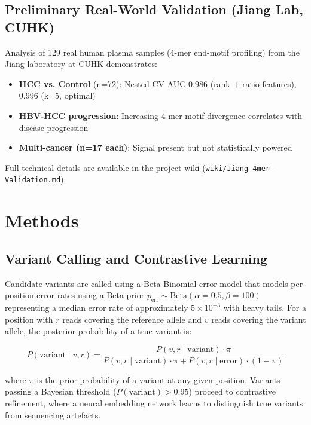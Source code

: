 \documentclass[11pt,a4paper]{article}
\begin{document}
\subsection{Preliminary Real-World Validation (Jiang Lab, CUHK)}

Analysis of 129 real human plasma samples (4-mer end-motif profiling) from the Jiang laboratory at CUHK demonstrates:

\begin{itemize}
    \item \textbf{HCC vs. Control} (n=72): Nested CV AUC 0.986 (rank + ratio features), 0.996 (k=5, optimal)
    \item \textbf{HBV-HCC progression}: Increasing 4-mer motif divergence correlates with disease progression
    \item \textbf{Multi-cancer (n=17 each)}: Signal present but not statistically powered
\end{itemize}

Full technical details are available in the project wiki (\texttt{wiki/Jiang-4mer-Validation.md}).

\section{Methods}

\subsection{Variant Calling and Contrastive Learning}

Candidate variants are called using a Beta-Binomial error model that models per-position error rates using a Beta prior $p_{\text{err}} \sim \text{Beta}(\alpha=0.5, \beta=100)$ representing a median error rate of approximately $5 \times 10^{-3}$ with heavy tails. For a position with $r$ reads covering the reference allele and $v$ reads covering the variant allele, the posterior probability of a true variant is:

\begin{equation}
P(\text{variant} \mid v, r) = \frac{P(v, r \mid \text{variant}) \cdot \pi}{P(v, r \mid \text{variant}) \cdot \pi + P(v, r \mid \text{error}) \cdot (1 - \pi)}
\end{equation}

where $\pi$ is the prior probability of a variant at any given position. Variants passing a Bayesian threshold ($P(\text{variant}) > 0.95$) proceed to contrastive refinement, where a neural embedding network learns to distinguish true variants from sequencing artefacts.
\end{document}

